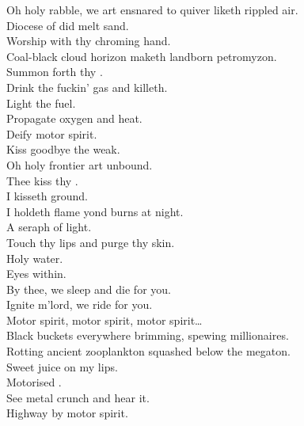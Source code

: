 \subtitle{%
    or, Dawn of Eternal Night: 
	An Annihilation of Planet Earth and the Beginning of Merciless Damnation \\
}

\label{album:petrodragonic-apocalypse}



Oh holy rabble, we art ensnared to quiver liketh rippled air. \\
Diocese of did melt sand. \\
Worship with thy chroming hand. \\
Coal-black cloud horizon maketh landborn petromyzon. \\
Summon forth thy . \\
Drink the fuckin' gas and killeth. \\

Light the fuel. \\
Propagate oxygen and heat. \\
Deify motor spirit. \\
Kiss goodbye the weak. \\

Oh holy frontier art unbound. \\
Thee kiss thy . \\
I kisseth ground. \\
I holdeth flame yond burns at night. \\
A seraph of  light. \\
Touch thy lips and purge thy skin. \\
Holy water. \\
Eyes within. \\
By thee, we sleep and die for you. \\
Ignite m'lord, we ride for you. \\

Motor spirit, motor spirit, motor spirit… \\

Black buckets everywhere brimming, spewing millionaires. \\
Rotting ancient zooplankton squashed below the megaton. \\
Sweet juice on my lips. \\
Motorised . \\
See metal crunch and hear it. \\
Highway  by motor spirit. \\

